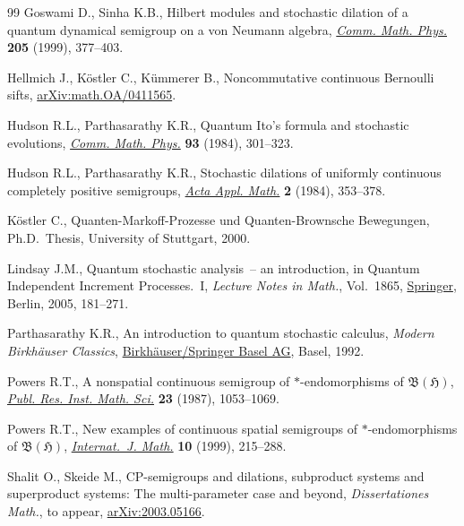 \documentclass[11pt]{article}
\numberwithin{equation}{section}
\numberwithin{equation}{section}
\begin{document}
\begin{thebibliography}{99}
Goswami D., Sinha K.B., Hilbert modules and stochastic dilation of a quantum
 dynamical semigroup on a von {N}eumann algebra, \href{https://doi.org/10.1007/s002200050682}{\textit{Comm. Math. Phys.}}
 \textbf{205} (1999), 377--403.

Hellmich J., K\"ostler C., K\"ummerer B., Noncommutative continuous Bernoulli
 sifts, \href{https://arxiv.org/abs/math.OA/0411565}{arXiv:math.OA/0411565}.

Hudson R.L., Parthasarathy K.R., Quantum {I}to's formula and stochastic
 evolutions, \href{https://doi.org/10.1007/BF01258530}{\textit{Comm. Math. Phys.}} \textbf{93} (1984), 301--323.

Hudson R.L., Parthasarathy K.R., Stochastic dilations of uniformly continuous
 completely positive semigroups, \href{https://doi.org/10.1007/BF02280859}{\textit{Acta Appl. Math.}} \textbf{2} (1984),
 353--378.

K\"ostler C., Quanten-Markoff-Prozesse und Quanten-Brownsche Bewegungen, Ph.D.~Thesis, {U}niversity of Stuttgart, 2000.

Lindsay J.M., Quantum stochastic analysis~-- an introduction, in Quantum
 Independent Increment Processes.~{I}, \textit{Lecture Notes in Math.}, Vol.~1865, \href{https://doi.org/10.1007/11376569_3}{Springer}, Berlin, 2005, 181--271.

Parthasarathy K.R., An introduction to quantum stochastic calculus, \textit{Modern
 Birkh\"auser Classics}, \href{https://doi.org/10.1007/978-3-0348-0566-7}{Birkh\"auser/Springer Basel AG}, Basel, 1992.

Powers R.T., A nonspatial continuous semigroup of {$*$}-endomorphisms of
 {${\mathfrak B}({\mathfrak H})$}, \href{https://doi.org/10.2977/prims/1195175872}{\textit{Publ. Res. Inst. Math. Sci.}}
 \textbf{23} (1987), 1053--1069.

Powers R.T., New examples of continuous spatial semigroups of
 {$\ast$}-endomorphisms of {$\mathfrak B(\mathfrak H)$}, \href{https://doi.org/10.1142/S0129167X99000094}{\textit{Internat.~J.
 Math.}} \textbf{10} (1999), 215--288.

Shalit O., Skeide M., CP-semigroups and dilations, subproduct systems and
 superproduct systems: The multi-parameter case and beyond,
 \textit{Dissertationes Math.}, {t}o appear, \href{https://arxiv.org/abs/2003.05166}{arXiv:2003.05166}.


\end{thebibliography}
\end{document}
